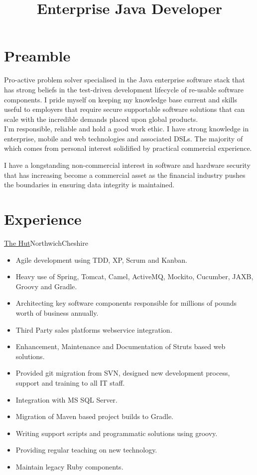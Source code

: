 \documentclass[a4paper,10pt]{moderncv}
\title{Enterprise Java Developer}
\newcommand\weblink[2] {{\color{href} \href{#1}{#2}}}
\begin{document}
\maketitle

\section{Preamble}
Pro-active problem solver specialised in the Java enterprise software stack that has strong beliefs in the test-driven development lifecycle of re-usable software components.
I pride myself on keeping my knowledge base current and skills useful to employers that require secure supportable software solutions that can scale with the incredible demands placed upon global products.\\

I'm responsible, reliable and hold a good work ethic.
I have strong knowledge in enterprise, mobile and web technologies and associated DSLs. The majority of which comes from personal interest solidified by practical commercial experience.

I have a longstanding non-commercial interest in software and hardware security that has increasing become a commercial asset as the financial industry pushes the boundaries in ensuring data integrity is maintained.

\section{Experience}

{\weblink{http://www.thehutgroup.com}{The Hut}}{Northwich}{Cheshire}{
\begin{itemize}
  \item Agile development using TDD, XP, Scrum and Kanban.
  \item Heavy use of Spring, Tomcat, Camel, ActiveMQ, Mockito, Cucumber, JAXB, Groovy and Gradle.
  \item Architecting key software components responsible for millions of pounds worth of business annually.
  \item Third Party sales platforms webservice integration.
  \item Enhancement, Maintenance and Documentation of Struts based web solutions.
  \item Provided git migration from SVN, designed new development process, support and training to all IT staff.
  \item Integration with MS SQL Server.
  \item Migration of Maven based project builds to Gradle.
  \item Writing support scripts and programmatic solutions using groovy.
  \item Providing regular teaching on new technology.
  \item Maintain legacy Ruby components.
\end{itemize}
}
\end{document}
